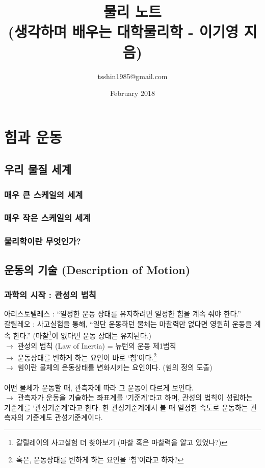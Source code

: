 \documentclass[10pt,a4paper]{report}
\title{물리 노트\\(생각하며 배우는 대학물리학 - 이기영 지음)}
\author{tsshin1985@gmail.com}
\date{February 2018}
\begin{document}
	
	\maketitle
	
	\part{힘과 운동}
	
	\chapter{우리 물질 세계}
	
	\section{매우 큰 스케일의 세계}
	
	\section{매우 작은 스케일의 세계}
	
	\section{물리학이란 무엇인가?}
	
	\chapter{운동의 기술 (Description of Motion)}
	
	\section{과학의 시작 : 관성의 법칙}
	
	아리스토텔레스 : ``일정한 운동 상태를 유지하려면 일정한 힘을 계속 줘야 한다.''\\
	갈릴레오 : 사고실험을 통해, ``일단 운동하던 물체는 마찰력만 없다면 영원히 운동을 계속 한다.''
	(마찰\footnote{갈릴레이의 사고실험 더 찾아보기 (마찰 혹은 마찰력을 알고 있었나?)}이 없다면 운동 상태는 유지된다.)\\
	$\rightarrow$ 관성의 법칙 (Law of Inertia) = 뉴턴의 운동 제1법칙\\
	$\rightarrow$ 운동상태를 변하게 하는 요인이 바로 `힘'이다.\footnote{혹은, 운동상태를 변하게 하는 요인을 `힘'이라고 하자?}\\
	$\rightarrow$ 힘이란 물체의 운동상태를 변화시키는 요인이다. (힘의 정의 도출)\\
	\\
	어떤 물체가 운동할 때, 관측자에 따라 그 운동이 다르게 보인다.\\
	$\rightarrow$ 관측자가 운동을 기술하는 좌표계를 `기준계'라고 하며, 관성의 법칙이 성립하는 기준계를 `관성기준계'라고 한다.
	한 관성기준계에서 볼 때 일정한 속도로 운동하는 관측자의 기준계도 관성기준계이다.
	
\end{document}
